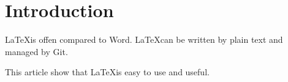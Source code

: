 \section{Introduction}

\LaTeX is offen compared to Word. \LaTeX can be written by plain text and managed by Git.

This article show that \LaTeX is easy to use and useful.
